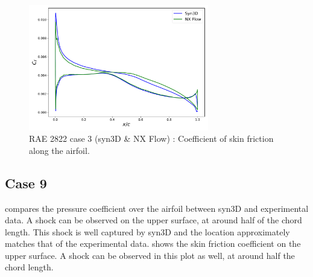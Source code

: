\begin{figure}
    \centering
    \includegraphics[width=0.7\textwidth]{figs/rae/cf_case3}
    \caption{RAE 2822 case 3 (syn3D \& NX Flow) : Coefficient of skin friction along the airfoil.}
    \label{fig:raecf3}
\end{figure}

\subsection{Case 9}
 compares the pressure coefficient over the airfoil between syn3D and experimental data. A shock can be observed on the upper surface, at around half of the chord length. This shock is well captured by syn3D and the location approximately matches that of the experimental data.  shows the skin friction coefficient on the upper surface. A shock can be observed in this plot as well, at around half the chord length.


